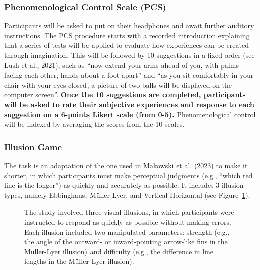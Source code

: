 \documentclass[
  man,
  floatsintext,
  longtable,
  nolmodern,
  notxfonts,
  notimes,
  colorlinks=true,linkcolor=blue,citecolor=blue,urlcolor=blue]{apa7}
\begin{document}
\subsubsection{Phenomenological Control Scale
(PCS)}\label{phenomenological-control-scale-pcs}

Participants will be asked to put on their headphones and await further
auditory instructions. The PCS procedure starts with a recorded
introduction explaining that a series of tests will be applied to
evaluate how experiences can be created through imagination. This will
be followed by 10 suggestions in a fixed order (see Lush et al., 2021),
such as ``now extend your arms ahead of you, with palms facing each
other, hands about a foot apart'' and ``as you sit comfortably in your
chair with your eyes closed, a picture of two balls will be displayed on
the computer screen''. \textbf{Once the 10 suggestions are completed,
participants will be asked to rate their subjective experiences and
response to each suggestion on a 6-points Likert scale (from 0-5).}
Phenomenological control will be indexed by averaging the scores from
the 10 scales.

\subsubsection{Illusion Game}\label{illusion-game}

The task is an adaptation of the one used in Makowski et al. (2023) to
make it shorter, in which participants must make perceptual judgments
(e.g., ``which red line is the longer'') as quickly and accurately as
possible. It includes 3 illusion types, namely Ebbinghaus, Müller-Lyer,
and Vertical-Horizontal (see Figure~\ref{fig-illusionexample}).

\begin{figure}

\caption{\label{fig-illusionexample}The study involved three visual
illusions, in which participants were instructed to respond as quickly
as possible without making errors. Each illusion included two
manipulated parameters: strength (e.g., the angle of the outward- or
inward-pointing arrow-like fins in the Müller-Lyer illusion) and
difficulty (e.g., the difference in line lengths in the Müller-Lyer
illusion).}


\end{figure}%
\end{document}
